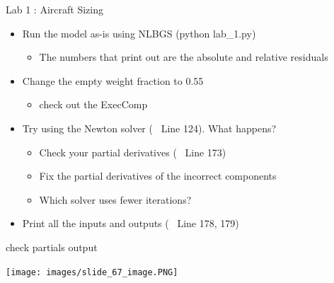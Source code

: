 \documentclass[aspectratio=169, usenames,dvipsnames, 14pt]{beamer}
\begin{document}
\begin{frame}{Lab 1 : Aircraft Sizing}
    \begin{itemize}
        \item Run the model as-is using NLBGS (python lab\_1.py)
            \begin{itemize}
                \item The numbers that print out are the absolute and relative residuals
            \end{itemize}
            
        \vspace{0.25cm}
        \item Change the empty weight fraction to 0.55 
            \begin{itemize}
                \item check out the ExecComp
            \end{itemize}
            
        \vspace{0.25cm}
        \item Try using the Newton solver (~ Line 124). What happens?
            \begin{itemize}
                \item Check your partial derivatives (~ Line 173)
                \item Fix the partial derivatives of the incorrect components
                \item Which solver uses fewer iterations?
            \end{itemize}
            
        \vspace{0.25cm}
        \item Print all the inputs and outputs (~ Line 178, 179)
    \end{itemize}
    
\end{frame}


\begin{frame}{check partials output}

\texttt{[image: images/slide\_67\_image.PNG]}
    
\end{frame}

\end{document}
